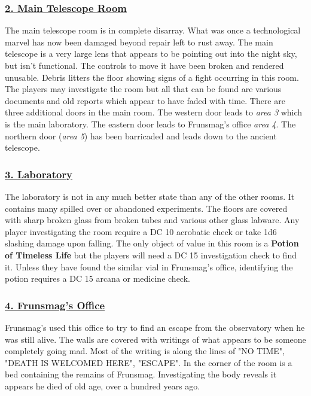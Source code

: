\documentclass{article}
\begin{document}
\begin{multicols*}{2}
		\subsubsection*{\underline{2. Main Telescope Room}}
		The main telescope room is in complete disarray. What was once a technological marvel has now been damaged beyond repair left to rust away. The main telescope is a very large lens that appears to be pointing out into the night sky, but isn't functional. The controls to move it have been broken and rendered unusable. Debris litters the floor showing signs of a fight occurring in this room. The players may investigate the room but all that can be found are various documents and old reports which appear to have faded with time. There are three additional doors in the main room. The western door leads to \emph{area 3} which is the main laboratory. The eastern door leads to Frunsmag's office \emph{area 4}. The northern door (\emph{area 5}) has been barricaded and leads down to the ancient telescope.
		
		\subsubsection*{\underline{3. Laboratory}}
		The laboratory is not in any much better state than any of the other rooms. It contains many spilled over or abandoned experiments. The floors are covered with sharp broken glass from broken tubes and various other glass labware. Any player investigating the room require a DC 10 acrobatic check or take 1d6 slashing damage upon falling. The only object of value in this room is a \textbf{Potion of Timeless Life} but the players will need a DC 15 investigation check to find it. Unless they have found the similar vial in Frunsmag's office, identifying the potion requires a DC 15 arcana or medicine check. 
		
		\subsubsection*{\underline{4. Frunsmag's Office}}
		Frunsmag's used this office to try to find an escape from the observatory when he was still alive. The walls are covered with writings of what appears to be someone completely going mad. Most of the writing is along the lines of "NO TIME", "DEATH IS WELCOMED HERE", "ESCAPE". In the corner of the room is a bed containing the remains of Frunsmag. Investigating the body reveals it appears he died of old age, over a hundred years ago.
		

\end{multicols*}
\end{document}

